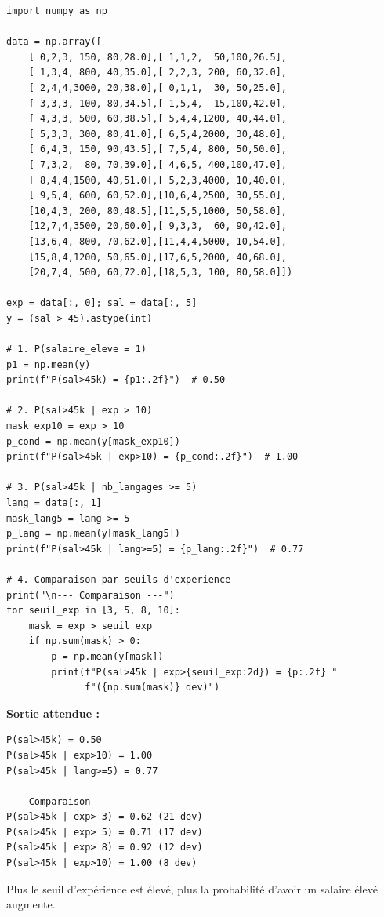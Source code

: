 \begin{pythonbox}
\begin{lstlisting}
import numpy as np

data = np.array([
    [ 0,2,3, 150, 80,28.0],[ 1,1,2,  50,100,26.5],
    [ 1,3,4, 800, 40,35.0],[ 2,2,3, 200, 60,32.0],
    [ 2,4,4,3000, 20,38.0],[ 0,1,1,  30, 50,25.0],
    [ 3,3,3, 100, 80,34.5],[ 1,5,4,  15,100,42.0],
    [ 4,3,3, 500, 60,38.5],[ 5,4,4,1200, 40,44.0],
    [ 5,3,3, 300, 80,41.0],[ 6,5,4,2000, 30,48.0],
    [ 6,4,3, 150, 90,43.5],[ 7,5,4, 800, 50,50.0],
    [ 7,3,2,  80, 70,39.0],[ 4,6,5, 400,100,47.0],
    [ 8,4,4,1500, 40,51.0],[ 5,2,3,4000, 10,40.0],
    [ 9,5,4, 600, 60,52.0],[10,6,4,2500, 30,55.0],
    [10,4,3, 200, 80,48.5],[11,5,5,1000, 50,58.0],
    [12,7,4,3500, 20,60.0],[ 9,3,3,  60, 90,42.0],
    [13,6,4, 800, 70,62.0],[11,4,4,5000, 10,54.0],
    [15,8,4,1200, 50,65.0],[17,6,5,2000, 40,68.0],
    [20,7,4, 500, 60,72.0],[18,5,3, 100, 80,58.0]])

exp = data[:, 0]; sal = data[:, 5]
y = (sal > 45).astype(int)

# 1. P(salaire_eleve = 1)
p1 = np.mean(y)
print(f"P(sal>45k) = {p1:.2f}")  # 0.50

# 2. P(sal>45k | exp > 10)
mask_exp10 = exp > 10
p_cond = np.mean(y[mask_exp10])
print(f"P(sal>45k | exp>10) = {p_cond:.2f}")  # 1.00

# 3. P(sal>45k | nb_langages >= 5)
lang = data[:, 1]
mask_lang5 = lang >= 5
p_lang = np.mean(y[mask_lang5])
print(f"P(sal>45k | lang>=5) = {p_lang:.2f}")  # 0.77

# 4. Comparaison par seuils d'experience
print("\n--- Comparaison ---")
for seuil_exp in [3, 5, 8, 10]:
    mask = exp > seuil_exp
    if np.sum(mask) > 0:
        p = np.mean(y[mask])
        print(f"P(sal>45k | exp>{seuil_exp:2d}) = {p:.2f} "
              f"({np.sum(mask)} dev)")
\end{lstlisting}
\end{pythonbox}

\textbf{Sortie attendue :}
\begin{verbatim}
P(sal>45k) = 0.50
P(sal>45k | exp>10) = 1.00
P(sal>45k | lang>=5) = 0.77

--- Comparaison ---
P(sal>45k | exp> 3) = 0.62 (21 dev)
P(sal>45k | exp> 5) = 0.71 (17 dev)
P(sal>45k | exp> 8) = 0.92 (12 dev)
P(sal>45k | exp>10) = 1.00 (8 dev)
\end{verbatim}

Plus le seuil d'exp\'{e}rience est \'{e}lev\'{e}, plus la probabilit\'{e} d'avoir un salaire \'{e}lev\'{e} augmente.

